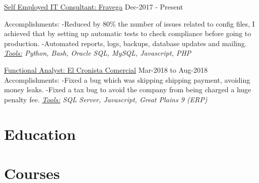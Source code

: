 \documentclass[letterpaper]{twentysecondcv} %
\begin{document}
{\large\underline{Self Employed IT Consultant: Fravega}} \hspace*{55pt} Dec-2017 - Present
\newline

Accomplishments: 
    \newline-Reduced by 80\% the number of issues related to config files, I achieved that by setting up automatic tests to check compliance before going to production.
    \newline-Automated reports, logs, backups, database updates and mailing.
    \newline\newline\textit{\underline{Tools:} Python, Bash, Oracle SQL, MySQL, Javascript, PHP}
    \newline\newline
    
	
	{\large\underline{Functional Analyst: El Cronista Comercial}} \hspace*{5pt} Mar-2018 to Aug-2018
	\newline\newline
	Accomplishments:
    \newline-Fixed a bug which was skipping shipping payment, avoiding money leaks.
    \newline-Fixed a tax bug to avoid the company from being charged a huge penalty fee.
    \newline\newline\textit{\underline{Tools:} SQL Server, Javascript, Great Plains 9 (ERP)}
    \newline
    

\section{Education}

\begin{twenty} %

\end{twenty}


\section{Courses}


 \begin{twenty}
 \end{twenty}
\end{document}
